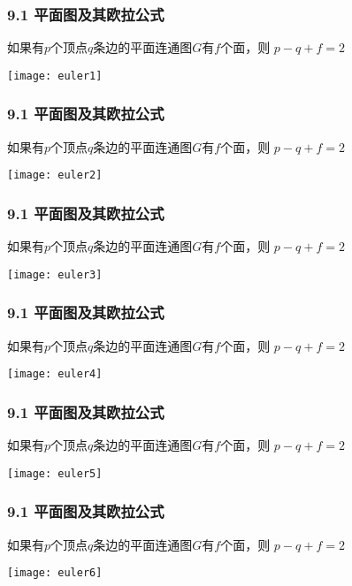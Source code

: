 \documentclass{beamer}
\begin{document}
\begin{CJK}{UTF8}{gbsn}
\begin{frame}
  \frametitle{9.1 平面图及其欧拉公式}
  \begin{Thm1}
    如果有$p$个顶点$q$条边的平面连通图$G$有$f$个面，则
      $p - q + f = 2$
  \end{Thm1}
\vspace{1cm}
\centering
    \texttt{[image: euler1]}
\end{frame}
\begin{frame}
  \frametitle{9.1 平面图及其欧拉公式}
  \begin{Thm1}
    如果有$p$个顶点$q$条边的平面连通图$G$有$f$个面，则
      $p - q + f = 2$
  \end{Thm1}
\vspace{1cm}
\centering
    \texttt{[image: euler2]}
\end{frame}
\begin{frame}
  \frametitle{9.1 平面图及其欧拉公式}
  \begin{Thm1}
    如果有$p$个顶点$q$条边的平面连通图$G$有$f$个面，则
      $p - q + f = 2$
  \end{Thm1}
\vspace{1cm}
\centering
    \texttt{[image: euler3]}
\end{frame}
\begin{frame}
  \frametitle{9.1 平面图及其欧拉公式}
  \begin{Thm1}
    如果有$p$个顶点$q$条边的平面连通图$G$有$f$个面，则
      $p - q + f = 2$
  \end{Thm1}
\vspace{1cm}
\centering
    \texttt{[image: euler4]}
\end{frame}
\begin{frame}
  \frametitle{9.1 平面图及其欧拉公式}
  \begin{Thm1}
    如果有$p$个顶点$q$条边的平面连通图$G$有$f$个面，则
      $p - q + f = 2$
  \end{Thm1}
\vspace{1cm}
\centering
    \texttt{[image: euler5]}
\end{frame}

\begin{frame}
  \frametitle{9.1 平面图及其欧拉公式}
  \begin{Thm1}
    如果有$p$个顶点$q$条边的平面连通图$G$有$f$个面，则
      $p - q + f = 2$
  \end{Thm1}
\vspace{1cm}
\centering
    \texttt{[image: euler6]}
\end{frame}


\end{CJK}
\end{document}
